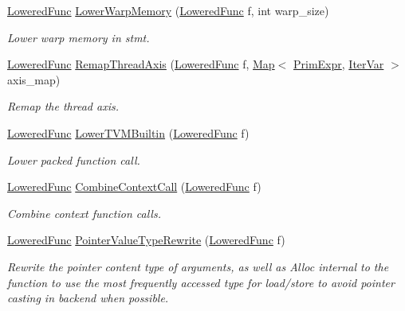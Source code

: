 \begin{DoxyCompactItemize}
\hyperlink{classtvm_1_1tir_1_1LoweredFunc}{Lowered\+Func} \hyperlink{namespacetvm_1_1tir_af5111eb3e9b9d2f52998c5db4b4e3ae9}{Lower\+Warp\+Memory} (\hyperlink{classtvm_1_1tir_1_1LoweredFunc}{Lowered\+Func} f, int warp\+\_\+size)
\begin{DoxyCompactList}\small\item\em Lower warp memory in stmt. \end{DoxyCompactList}\item 
\hyperlink{classtvm_1_1tir_1_1LoweredFunc}{Lowered\+Func} \hyperlink{namespacetvm_1_1tir_ad55f17f026155f1424b3d0fdd3f86435}{Remap\+Thread\+Axis} (\hyperlink{classtvm_1_1tir_1_1LoweredFunc}{Lowered\+Func} f, \hyperlink{classtvm_1_1Map}{Map}$<$ \hyperlink{classtvm_1_1PrimExpr}{Prim\+Expr}, \hyperlink{classtvm_1_1tir_1_1IterVar}{Iter\+Var} $>$ axis\+\_\+map)
\begin{DoxyCompactList}\small\item\em Remap the thread axis. \end{DoxyCompactList}\item 
\hyperlink{classtvm_1_1tir_1_1LoweredFunc}{Lowered\+Func} \hyperlink{namespacetvm_1_1tir_a9d59ba0cb48da1661593b7eeb2e96821}{Lower\+T\+V\+M\+Builtin} (\hyperlink{classtvm_1_1tir_1_1LoweredFunc}{Lowered\+Func} f)
\begin{DoxyCompactList}\small\item\em Lower packed function call. \end{DoxyCompactList}\item 
\hyperlink{classtvm_1_1tir_1_1LoweredFunc}{Lowered\+Func} \hyperlink{namespacetvm_1_1tir_a5c2b224ff5bb292b1b7e677d50576b38}{Combine\+Context\+Call} (\hyperlink{classtvm_1_1tir_1_1LoweredFunc}{Lowered\+Func} f)
\begin{DoxyCompactList}\small\item\em Combine context function calls. \end{DoxyCompactList}\item 
\hyperlink{classtvm_1_1tir_1_1LoweredFunc}{Lowered\+Func} \hyperlink{namespacetvm_1_1tir_ad2814a5568d2e1329a5c5aab2e35091e}{Pointer\+Value\+Type\+Rewrite} (\hyperlink{classtvm_1_1tir_1_1LoweredFunc}{Lowered\+Func} f)
\begin{DoxyCompactList}\small\item\em Rewrite the pointer content type of arguments, as well as Alloc internal to the function to use the most frequently accessed type for load/store to avoid pointer casting in backend when possible. \end{DoxyCompactList}\item 

\end{DoxyCompactItemize}
